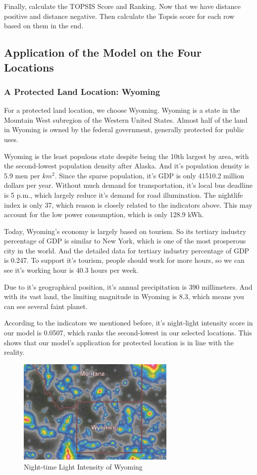 Finally, calculate the TOPSIS Score and Ranking. Now that we have distance positive and distance negative. Then calculate the Topsis score for each row based on them in the end.

\subsection{Application of the Model on the Four Locations}


\subsubsection{A Protected Land Location: Wyoming}
For a protected land location, we choose Wyoming. Wyoming is a state in the Mountain West subregion of the Western United States. Almost half of the land in Wyoming is owned by the federal government, generally protected for public uses.

Wyoming is the least populous state despite being the 10th largest by area, with the second-lowest population density after Alaska. And it's population density is 5.9 men per $km^2$. Since the sparse population, it's GDP is only 41510.2 million dollars per year. Without much demand for transportation, it's local bus deadline is 5 p.m., which largely reduce it's demand for road illumination. The nightlife index is only 37, which reason is closely related to the indicators above. This may account for the low power consumption, which is only 128.9 kWh. 

Today, Wyoming's economy is largely based on tourism. So its tertiary industry percentage of GDP is similar to New York, which is one of the most prosperous city in the world. And the detailed data for tertiary industry percentage of GDP is 0.247. To support it's tourism, people should work for more hours, so we can see it's working hour is 40.3 hours per week.

Due to it's geographical position, it's annual precipitation is 390 millimeters. And with its vast land, the limiting magnitude in Wyoming is 8.3, which means you can see several faint planet.

According to the indicators we mentioned before, it's night-light intensity score in our model is 0.0507, which ranks the second-lowest in our selected locations. This shows that our model's application for protected location  is in line with the reality.
\begin{figure}[H]\centering
    \includegraphics[width=0.68\textwidth]{figures/texted/Wyoming_new.jpg}
    \caption{Night-time Light Intensity of Wyoming} \label{fig:figure3}
\end{figure}


